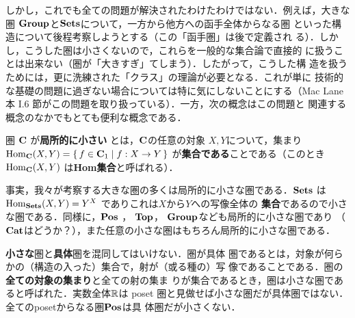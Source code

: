 しかし，これでも全ての問題が解決されたわけたわけではない．例えば，大きな
圏 ${\bf Group}$と$\mathbf{Sets}$について，一方から他方への函手全体からなる圏
といった構造について後程考察しようとする（この「函手圏」は後で定義され
る）．しかし，こうした圏は小さくないので，これらを一般的な集合論で直接的
に扱うことは出来ない（圏が「大きすぎ」てしまう）．したがって，こうした構
造を扱うためには，更に洗練された「クラス」の理論が必要となる．これが単に
技術的な基礎の問題に過ぎない場合については特に気にしないことにする（Mac
Lane 本 I.6 節がこの問題を取り扱っている）．一方，次の概念はこの問題と
関連する概念のなかでもとても便利な概念である．

\begin{definition}
 圏 ${\bf C}$ が{\bfseries 局所的に小さい}
 とは，${\bf C}$の任意の対象 $X, Y$について，集まり
 $\mathrm{Hom}_{\bf C}(X, Y) = \set{f \in {\bf C}_1 | f: X \to Y}$
 が{\bfseries 集合である}ことである（このとき $\mathrm{Hom}_{\bf C}(X, Y)$
 は{\bfseries Hom集合}と呼ばれる）．
\end{definition}
事実，我々が考察する大きな圏の多くは局所的に小さな圏である．$\mathbf{Sets}$ は
$\mathrm{Hom}_{\mathbf{Sets}}(X,Y) = Y^X$ でありこれは$X$から$Y$への写像全体の
{\bfseries 集合}であるので小さな圏である．同様に，$\mathbf{Pos}$
， ${\bf Top}$，
${\bf Group}$なども局所的に小さな圏であり
（$\mathbf{Cat}$はどうか？），また任意の小さな圏はもちろん局所的に小さな圏である．

\begin{warn}
 {\bfseries 小さな}圏と{\bfseries 具体}圏を混同してはいけない．圏が具体
 圏であるとは，対象が何らかの（構造の入った）集合で，射が（或る種の）写
 像であることである．圏の{\bfseries 全ての対象の集まり}と全ての射の集ま
 りが集合であるとき，圏は小さな圏であると呼ばれた．実数全体$\mathbb{R}$は poset
 圏と見做せば小さな圏だが具体圏ではない．全てのposetからなる圏$\mathbf{Pos}$は具
 体圏だが小さくない．
\end{warn}
